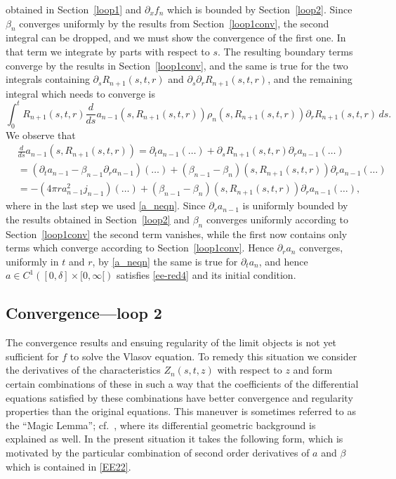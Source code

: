 \documentclass[11pt]{article}
\begin{document}
obtained in Section~\ref{loop1}
and $\partial_x f_n$ which is bounded by Section~\ref{loop2}.
Since $\beta_n$ converges uniformly by the results from
Section~\ref{loop1conv}, the second integral can be dropped,
and we must show the convergence of the first one. In that term we integrate by
parts with respect to $s$. The resulting boundary terms converge by the results
in Section~\ref{loop1conv}, and the same is true for the two integrals
containing $\partial_s R_{n+1}(s,t,r)$ and
$\partial_s \partial_r R_{n+1}(s,t,r)$, and the remaining
integral which needs to converge is
\[
\int_0^t R_{n+1}(s,t,r) \frac{d}{ds} a_{n-1}(s,R_{n+1}(s,t,r))
\rho_n (s,R_{n+1}(s,t,r)) \partial_r R_{n+1}(s,t,r)\, ds.
\]
We observe that
\begin{align*}
  &\frac{d}{ds} a_{n-1}(s,R_{n+1}(s,t,r))
  =
  \partial_t a_{n-1}(\ldots) + \partial_s R_{n+1}(s,t,r)\partial_r a_{n-1}(\ldots)\\
  &=\left(\partial_t a_{n-1} - \beta_{n-1}\partial_r a_{n-1}\right)(\ldots)
  +\left(\beta_{n-1}-\beta_n\right)(s,R_{n+1}(s,t,r)) \partial_r a_{n-1}(\ldots) \\
  &=-\left(4\pi r a_{n-1}^2 j_{n-1}\right)(\ldots)
  +\left(\beta_{n-1}-\beta_n\right)(s,R_{n+1}(s,t,r)) \partial_r a_{n-1}(\ldots),
\end{align*}
where in the last step we used \eqref{a_neqn}.
Since $\partial_r a_{n-1}$ is uniformly bounded
by the results obtained in Section~\ref{loop2} and $\beta_n$
converges uniformly according to
Section~\ref{loop1conv}  the second term vanishes,
while the first now contains only terms which
converge according to Section~\ref{loop1conv}.
Hence $\partial_r a_n$ converges, uniformly
in $t$ and $r$, by  \eqref{a_neqn} the same is true for $\partial_t a_n$,
and hence $a\in C^1([0,\delta]\times [0,\infty[)$ satisfies \eqref{ee-red4}
and its initial condition.
%
%
\subsection{Convergence---loop 2} \label{magic}
%
%
The convergence results and ensuing regularity of the limit objects
is not yet sufficient for $f$ to solve the Vlasov equation.
To remedy this situation we consider the derivatives
of the characteristics $Z_n(s,t,z)$ with respect to $z$ and form certain
combinations of these in such a way that the coefficients of
the differential equations satisfied by these combinations have
better convergence and regularity properties than
the original equations. This maneuver is sometimes referred to as
the ``Magic Lemma''; cf.~\cite[Lemma~2.3]{GB}, where its differential
geometric background is explained as well.
In the present situation it takes the following form,
which is motivated by the particular combination of second order derivatives of
$a$ and $\beta$ which is contained in \eqref{EE22}.
\end{document}
